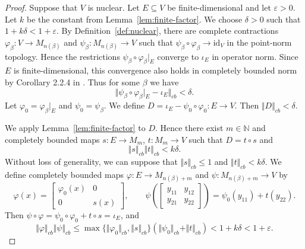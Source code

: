 \documentclass[12pt]{article}
\theoremstyle{definition}
\theoremstyle{remark}
\begin{document}
\begin{proof}
Suppose that $V$ is nuclear. Let $E\subseteq V$ be finite-dimensional
and let $\varepsilon>0$. Let $k$ be the constant from Lemma~\ref{lem:finite-factor}. We choose
$\delta>0$ such that $1+k\delta<1+\varepsilon$.
By Definition~\ref{def:nuclear}, there are complete contractions
$\varphi_\beta:V\to M_{n(\beta)}$ and $\psi_\beta:M_{n(\beta)}\to V$ such that
$\psi_\beta\circ\varphi_\beta\to\mathrm{id}_V$ in the point-norm topology.
Hence the restrictions $\psi_\beta\circ\varphi_\beta|_E$ converge to
$\iota_E$ in operator norm. Since $E$ is finite-dimensional, this convergence also holds in completely bounded norm by Corollary 2.2.4 in \cite{ER00}.
Thus for some $\beta$ we have
\[
\Vert\psi_\beta\circ\varphi_\beta|_E-\iota_E\Vert_{cb}<\delta.
\]
Let $\varphi_0=\varphi_\beta|_E$ and $\psi_0=\psi_\beta$. 
We define $D=\iota_E-\psi_0\circ\varphi_0:E\to V$.
Then $\Vert D\Vert_{cb}<\delta$.

We apply Lemma~\ref{lem:finite-factor} to $D$. Hence there exist $m\in\mathbb N$ and completely bounded maps
$s:E\to M_m$, $t:M_m\to V$ such that $D=t\circ s$ and
\[
\Vert s\Vert_{cb}\Vert t\Vert_{cb}<k\delta.
\]
Without loss of generality, we can suppose that $\Vert s\Vert_{cb}\leq 1$ and $\Vert t\Vert_{cb}<k\delta$. We define completely bounded maps $\varphi:E\to M_{n(\beta)+m}$ and $\psi:M_{n(\beta)+m}\to V$ by
\[
\varphi(x) = \begin{bmatrix} \varphi_0(x) & 0 \\ 0 & s(x) \end{bmatrix},
\qquad
\psi\left( \begin{bmatrix} y_{11} & y_{12} \\ y_{21} & y_{22} \end{bmatrix} \right)
= \psi_0(y_{11}) + t(y_{22}).
\]
Then $\psi\circ\varphi = \psi_0\circ\varphi_0 + t\circ s = \iota_E$, and
\[
\Vert\varphi\Vert_{cb}\Vert\psi\Vert_{cb}
\leq\max\{\Vert\varphi_0\Vert_{cb}, \Vert s\Vert_{cb}\} (\Vert\psi_0\Vert_{cb} + \Vert t\Vert_{cb})
<1+k\delta<1+\varepsilon.
\]


\end{proof}
\end{document}
